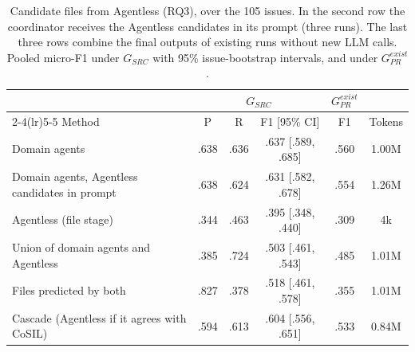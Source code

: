\begin{table}[t]
\centering
\caption{Candidate files from Agentless (RQ3), over the 105 issues. In the second row the coordinator receives the Agentless candidates in its prompt (three runs). The last three rows combine the final outputs of existing runs without new LLM calls. Pooled micro-F1 under $G_{SRC}$ with 95\% issue-bootstrap intervals, and under $G_{PR}^{exist}$.}
\label{tab:seed}
\scriptsize
\setlength{\tabcolsep}{3pt}
\begin{tabular}{p{3.1cm}ccccc}
\toprule
& \multicolumn{3}{c}{$G_{SRC}$} & $G_{PR}^{exist}$ & \\
\cmidrule(lr){2-4}\cmidrule(lr){5-5}
Method & P & R & F1 [95\% CI] & F1 & Tokens \\
\midrule
Domain agents & .638 & .636 & .637 [.589, .685] & .560 & 1.00M \\
Domain agents, Agentless candidates in prompt & .638 & .624 & .631 [.582, .678] & .554 & 1.26M \\
\midrule
Agentless (file stage) & .344 & .463 & .395 [.348, .440] & .309 & 4k \\
\midrule
Union of domain agents and Agentless & .385 & .724 & .503 [.461, .543] & .485 & 1.01M \\
Files predicted by both & .827 & .378 & .518 [.461, .578] & .355 & 1.01M \\
Cascade (Agentless if it agrees with CoSIL) & .594 & .613 & .604 [.556, .651] & .533 & 0.84M \\
\bottomrule
\end{tabular}
\end{table}
